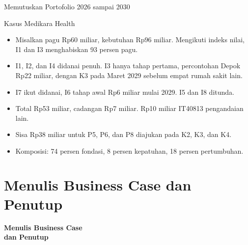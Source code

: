 \documentclass[aspectratio=169, table, 12pt]{beamer}
\begin{document}
\begin{frame}{{\Large Memutuskan Portofolio 2026 sampai 2030}}
  \begin{block}{Kasus Medikara Health}
    \small
    \begin{itemize}
      \item Misalkan pagu Rp60 miliar, kebutuhan Rp96 miliar. Mengikuti indeks nilai, I1 dan I3
            menghabiskan 93 persen pagu.
      \item I1, I2, dan I4 didanai penuh. I3 hanya tahap pertama, percontohan Depok Rp22 miliar,
            dengan K3 pada Maret 2029 sebelum empat rumah sakit lain.
      \item I7 ikut didanai, I6 tahap awal Rp6 miliar mulai 2029. I5 dan I8 ditunda.
      \item Total Rp53 miliar, cadangan Rp7 miliar. Rp10 miliar IT40813 pengandaian lain.
      \item Sisa Rp38 miliar untuk P5, P6, dan P8 diajukan pada K2, K3, dan K4.
      \item Komposisi: 74 persen fondasi, 8 persen kepatuhan, 18 persen pertumbuhan.
    \end{itemize}
  \end{block}
\end{frame}

\section{Menulis Business Case dan Penutup}

\begin{frame}{\hfill}
  \centering
  \Huge{\textbf{Menulis Business Case\\dan Penutup}}
\end{frame}
\end{document}
